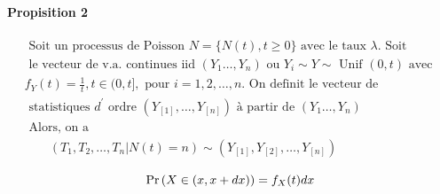 \paragraph{Propisition 2}
$$\begin{array}{l}{\text { Soit un processus de Poisson } N=\{N(t), t \geq 0\} \text { avec le taux } \lambda . \text { Soit }} \\ {\text { le vecteur de v.a. continues iid }\left(Y_{1} \ldots, Y_{n}\right) \text { ou } Y_{i} \sim Y \sim \text { Unif }(0, t) \text { avec }} \\ {f_{Y}(t)=\frac{1}{t}, t \in(0, t], \text { pour } i=1,2, \ldots, n . \text { On definit le vecteur de }} \\ {\text { statistiques } d^{\prime} \text { ordre }\left(Y_{[1]}, \ldots, Y_{[n]}\right) \text { à partir de }\left(Y_{1} \ldots, Y_{n}\right)} \\ {\text { Alors, on a }} \\ {\qquad\left(T_{1}, T_{2}, \ldots, T_{n} | N(t)=n\right) \sim\left(Y_{[1]}, Y_{[2]}, \ldots, Y_{[n]}\right)}\end{array}$$
\begin{note}
    \[ \Pr \left( X \in (x, x+dx) \right) = f_X(t) dx \]
\end{note}
